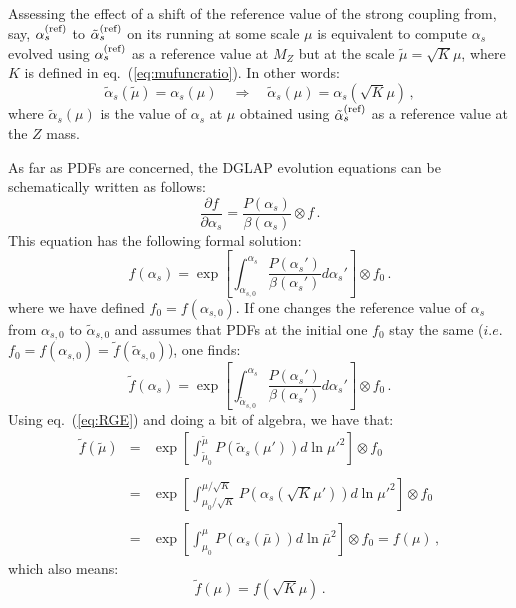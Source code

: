 \documentclass[10pt,a4paper]{article}
\begin{document}
Assessing the effect of a shift of the reference value of the strong
coupling from, say, $\alpha_s^{(\rm ref)}$ to
$\tilde\alpha_s^{(\rm ref)}$ on its running at some scale $\mu$ is
equivalent to compute $\alpha_s$ evolved using $\alpha_s^{(\rm ref)}$
as a reference value at $M_Z$ but at the scale
$\tilde\mu = \sqrt{K}\mu$, where $K$ is defined in
eq.~(\ref{eq:mufuncratio}). In other words:
\begin{equation}
\tilde\alpha_s(\tilde\mu)=\alpha_s(\mu)\quad\Longrightarrow\quad \tilde\alpha_s(\mu)=\alpha_s(\sqrt{K}\mu)\,,
\end{equation}
where $\tilde\alpha_s(\mu)$ is the value of $\alpha_s$ at $\mu$
obtained using $\tilde\alpha_s^{(\rm ref)}$ as a reference value at
the $Z$ mass.

As far as PDFs are concerned, the DGLAP evolution equations can be
schematically written as follows:
\begin{equation}
\frac{\partial f}{\partial\alpha_s} = \frac{P(\alpha_s)}{\beta(\alpha_s)}\otimes f\,.
\end{equation}
This equation has the following formal solution:
\begin{equation}
f(\alpha_s) = \exp\left[\int_{\alpha_{s,0}}^{\alpha_s}\frac{P(\alpha_s')}{\beta(\alpha_s')}d\alpha_s'\right]\otimes f_0\,.
\end{equation}
where we have defined $f_0=f(\alpha_{s,0})$. If one changes the
reference value of $\alpha_s$ from $\alpha_{s,0}$ to
$\tilde\alpha_{s,0}$ and assumes that PDFs at the initial one $f_0$
stay the same ($i.e.$
$f_0=f(\alpha_{s,0})=\tilde{f}(\tilde\alpha_{s,0})$), one finds:
\begin{equation}\label{eq:PDFtilde}
\tilde{f}(\alpha_s) = \exp\left[\int_{\tilde{\alpha}_{s,0}}^{\alpha_s}\frac{P(\alpha_s')}{\beta(\alpha_s')}d\alpha_s'\right]\otimes f_0\,.
\end{equation}
Using eq.~(\ref{eq:RGE}) and doing a bit of algebra, we have that:
\begin{equation}
\begin{array}{rcl}
\tilde{f}(\tilde\mu) &=&\displaystyle
                   \exp\left[\int_{\tilde\mu_0}^{\tilde\mu}P(\tilde\alpha_s(\mu'))d\ln\mu'^2\right]\otimes
                   f_0\\
\\
               &=&\displaystyle \exp\left[\int_{\mu_0/\sqrt{K}}^{\mu/\sqrt{K}}P(\alpha_s(\sqrt{K}\mu'))d\ln\mu'^2\right]\otimes
                   f_0\\
\\
               &=&\displaystyle \exp\left[\int_{\mu_0}^{\mu}P(\alpha_s(\bar\mu))d\ln \bar\mu^2\right]\otimes
                   f_0 = f(\mu)\,,
\end{array}
\end{equation}
which also means:
\begin{equation}
\tilde{f}(\mu) = f(\sqrt{K}\mu)\,.
\end{equation}
\end{document}
